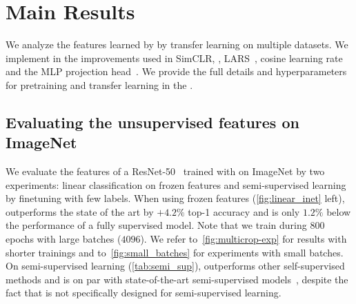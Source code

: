 \section{Main Results}\label{sec:exp}
We analyze the features learned by \OURS by transfer learning on multiple datasets. 
We implement in \OURS the improvements used in SimCLR, \ie, LARS~\cite{you2017large}, cosine learning rate~\cite{loshchilov2016sgdr,misra2019self} and the MLP projection head~\cite{chen2020simple}. 
We provide the full details and hyperparameters for pretraining and transfer learning in the \appendixName.

\subsection{Evaluating the unsupervised features on ImageNet}
\label{sec:eval_on_imagenet}
We evaluate the features of a ResNet-50~\cite{he2016deep} trained with \OURS on ImageNet by two experiments: linear classification on frozen features and semi-supervised learning by finetuning with few labels.
When using frozen features (\cref{fig:linear_inet} left), \OURS outperforms the state of the art by $+4.2\%$ top-1 accuracy and is only $1.2\%$ below the performance of a fully supervised model.
Note that we train \OURS during $800$ epochs with large batches ($4096$).
We refer to~\cref{fig:multicrop-exp} for results with shorter trainings and to~\cref{fig:small_batches} for experiments with small batches.
On semi-supervised learning (\cref{tab:semi_sup}), \OURS outperforms other self-supervised methods and is on par with state-of-the-art semi-supervised models~\cite{sohn2020fixmatch}, despite the fact that \OURS is not specifically designed for semi-supervised learning.

